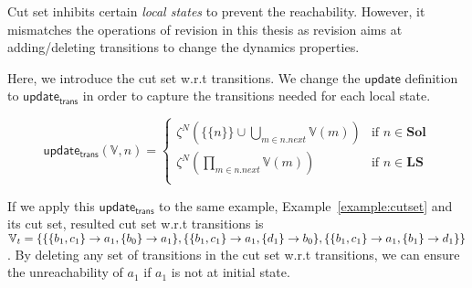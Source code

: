 Cut set inhibits certain \textit{local states} to prevent the reachability.
However, it mismatches the operations of revision in this thesis as revision aims at adding/deleting transitions to change the dynamics properties.

Here, we introduce the cut set w.r.t transitions.
We change the $\mathsf{update}$ definition to $\mathsf{update_{trans}}$ in order to capture the transitions needed for each local state.

\begin{definition}
\begin{equation}  
\mathsf{update_{trans}}(\mathbb{V},n)= 
      \begin{cases}
            \zeta^N(\{\{n\}\}\cup\bigcup_{m\in n.next}\mathbb{V}(m))&\text{if } n\in\mathbf{Sol}\\
            \zeta^N(\prod_{m\in n.next}\mathbb{V}(m))&\text{if } n\in\mathbf{LS}\\
      \end{cases}
\end{equation}
\end{definition}


If we apply this $\mathsf{update_{trans}}$ 
to the same example, Example~\ref{example:cutset} and its cut set, resulted cut set w.r.t transitions is $\mathbb{V}_t= \{\{\{b_1,c_1\}\rightarrow a_1,\{b_0\}\rightarrow a_1\},\{\{b_1,c_1\}\rightarrow a_1,\{d_1\}\rightarrow b_0\},\{\{b_1,c_1\}\rightarrow a_1,\{b_1\}\rightarrow d_1\}\}$.
By deleting any set of transitions in the cut set w.r.t transitions, we can ensure the unreachability of $a_1$ if $a_1$ is not at initial state.

